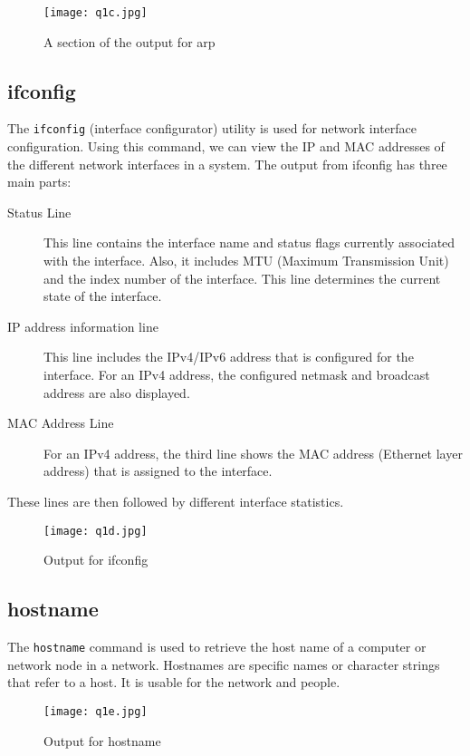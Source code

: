 \documentclass{article}
\let\oldtexttt\texttt
\renewcommand{\texttt}[1]{
  \colorbox{bgcolor}{\oldtexttt{#1}}
  }
\begin{document}
\begin{figure}[!hbt]
    \centering
    \texttt{[image: q1c.jpg]}
    \caption{A section of the output for arp}
    \label{fig:my_label3}
\end{figure}

\vspace{-0.75cm}
\subsection{ifconfig}
The \texttt{ifconfig} (interface configurator) utility is used for network interface configuration. Using this command, we can view the IP and MAC addresses of the different network interfaces in a system. The output from ifconfig has three main parts:
\begin{description}
    \item[Status Line] This line contains the interface name and status flags currently associated with the interface. Also, it includes MTU (Maximum Transmission Unit) and the index number of the interface. This line determines the current state of the interface. 
    \item[IP address information line] This line includes the IPv4/IPv6 address that is configured for the interface. For an IPv4 address, the configured netmask and broadcast address are also displayed.
    \item[MAC Address Line] For an IPv4 address, the third line shows the MAC address (Ethernet layer address) that is assigned to the interface. 
\end{description}
These lines are then followed by different interface statistics. 

\begin{figure}[!hbt]
    \centering
    \texttt{[image: q1d.jpg]}
    \caption{Output for ifconfig}
    \label{fig:my_label4}
\end{figure}
\newpage

\subsection{hostname}
The \texttt{hostname} command is used to retrieve the host name of a computer or network node in a network. Hostnames are specific names or character strings that refer to a host. It is usable for the network and people.
\begin{figure}[!hbt]
    \centering
    \texttt{[image: q1e.jpg]}
    \caption{Output for hostname}
    \label{fig:my_label5}
\end{figure}
\end{document}
